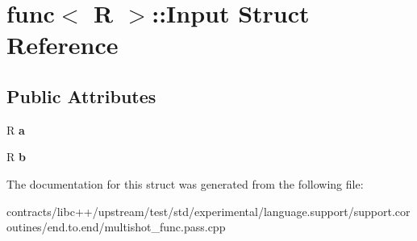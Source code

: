 \hypertarget{structfunc_1_1_input}{}\section{func$<$ R $>$\+:\+:Input Struct Reference}
\label{structfunc_1_1_input}
\subsection*{Public Attributes}
\begin{DoxyCompactItemize}
\item 
\mbox{\label{structfunc_1_1_input_a353e94b325a1be1b51c2933d45a388d6}} 
R {\bfseries a}
\item 
\mbox{\label{structfunc_1_1_input_a6c2624f2e809a1ba4b529613d9647084}} 
R {\bfseries b}
\end{DoxyCompactItemize}


The documentation for this struct was generated from the following file\+:\begin{DoxyCompactItemize}
\item 
contracts/libc++/upstream/test/std/experimental/language.\+support/support.\+coroutines/end.\+to.\+end/multishot\+\_\+func.\+pass.\+cpp\end{DoxyCompactItemize}
